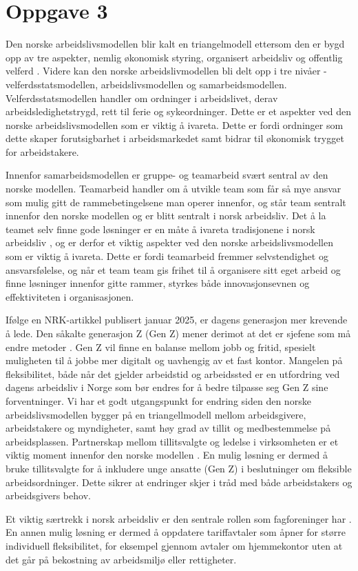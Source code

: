 \section{Oppgave 3}
Den norske arbeidslivsmodellen blir kalt en triangelmodell ettersom den er bygd opp av tre aspekter, nemlig økonomisk styring, organisert arbeidsliv og offentlig velferd  \parencite[][s.182]{Teknologiledelse}. 
Videre kan den norske arbeidslivmodellen bli delt opp i tre nivåer - velferdsstatsmodellen, arbeidslivsmodellen og samarbeidsmodellen. 
Velferdsstatsmodellen handler om ordninger i arbeidslivet, derav arbeidsledighetstrygd, rett til ferie og sykeordninger. 
Dette er et aspekter ved den norske arbeidslivsmodellen som er viktig å ivareta. Dette er fordi ordninger som dette skaper forutsigbarhet i arbeidsmarkedet samt bidrar til økonomisk trygget for arbeidstakere.
 
Innenfor samarbeidsmodellen er gruppe- og teamarbeid svært sentral av den norske modellen. 
Teamarbeid handler om å utvikle team som får så mye ansvar som mulig gitt de rammebetingelsene man operer innenfor, og står team sentralt innenfor den norske modellen og er blitt sentralt i norsk arbeidsliv. 
Det å la teamet selv finne gode løsninger er en måte å ivareta tradisjonene i norsk arbeidsliv \parencite[][s.192]{Teknologiledelse} , og er derfor et viktig aspekter ved den norske arbeidslivsmodellen som er viktig å ivareta. 
Dette er fordi teamarbeid fremmer selvstendighet og ansvarsfølelse, og når et team team gis frihet til å organisere sitt eget arbeid og finne løsninger innenfor gitte rammer, styrkes både innovasjonsevnen og effektiviteten i organisasjonen.
 
Ifølge en NRK-artikkel publisert januar 2025, er dagens generasjon mer krevende å lede. Den såkalte generasjon Z (Gen Z) mener derimot at det er sjefene som må endre metoder \cite{NRK}. Gen Z vil finne en balanse mellom jobb og fritid, spesielt muligheten til å jobbe mer digitalt og uavhengig av et fast kontor.  Mangelen på fleksibilitet, både når det gjelder arbeidstid og arbeidssted er en utfordring ved dagens arbeidsliv i Norge som bør endres for å bedre tilpasse seg Gen Z sine forventninger. Vi har et godt utgangspunkt for endring siden den norske arbeidslivsmodellen bygger på en triangellmodell mellom arbeidsgivere, arbeidstakere og myndigheter, samt høy grad av tillit og medbestemmelse på arbeidsplassen. Partnerskap mellom tillitsvalgte og ledelse i virksomheten er et viktig moment innenfor den norske modellen \parencite[][s.193]{Teknologiledelse}. 
En mulig løsning er dermed å bruke tillitsvalgte for å inkludere unge ansatte (Gen Z) i beslutninger om fleksible arbeidsordninger. Dette sikrer at endringer skjer i tråd med både arbeidstakers og arbeidsgivers behov.
 
 
Et viktig særtrekk i norsk arbeidsliv er den sentrale rollen som fagforeninger har \parencite[][s.182]{Teknologiledelse}. En annen mulig løsning er dermed å oppdatere tariffavtaler som åpner for større individuell fleksibilitet, for eksempel gjennom avtaler om hjemmekontor uten at det går på bekostning av arbeidsmiljø eller rettigheter. 